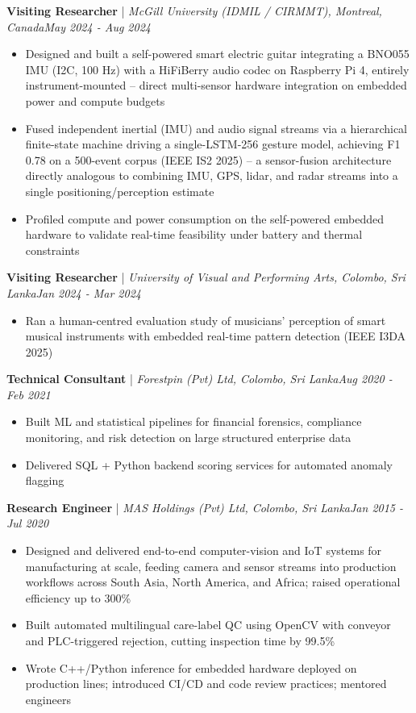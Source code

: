 \documentclass[11pt]{article}
\newenvironment{cvrole}[5]{%
  \par\noindent\textbf{\large #1} | \textit{\small #2, #3}\hfill \textit{\small #4 - #5}\par
  \begin{itemize}[leftmargin=2em, itemsep=-0.3em, topsep=-0.5em]%
}{%
  \end{itemize}\par\noindent\mbox{}\par\vspace{0.1em}%
}
\begin{document}
\begin{cvrole}{Visiting Researcher}{McGill University (IDMIL / CIRMMT)}{Montreal, Canada}{May 2024}{Aug 2024}
\item Designed and built a self-powered smart electric guitar integrating a BNO055 IMU (I2C, 100 Hz) with a HiFiBerry audio codec on Raspberry Pi 4, entirely instrument-mounted -- direct multi-sensor hardware integration on embedded power and compute budgets
\item Fused independent inertial (IMU) and audio signal streams via a hierarchical finite-state machine driving a single-LSTM-256 gesture model, achieving F1 0.78 on a 500-event corpus (IEEE IS2 2025) -- a sensor-fusion architecture directly analogous to combining IMU, GPS, lidar, and radar streams into a single positioning/perception estimate
\item Profiled compute and power consumption on the self-powered embedded hardware to validate real-time feasibility under battery and thermal constraints
\end{cvrole}

\begin{cvrole}{Visiting Researcher}{University of Visual and Performing Arts}{Colombo, Sri Lanka}{Jan 2024}{Mar 2024}
\item Ran a human-centred evaluation study of musicians' perception of smart musical instruments with embedded real-time pattern detection (IEEE I3DA 2025)
\end{cvrole}

\begin{cvrole}{Technical Consultant}{Forestpin (Pvt) Ltd}{Colombo, Sri Lanka}{Aug 2020}{Feb 2021}
\item Built ML and statistical pipelines for financial forensics, compliance monitoring, and risk detection on large structured enterprise data
\item Delivered SQL + Python backend scoring services for automated anomaly flagging
\end{cvrole}

\begin{cvrole}{Research Engineer}{MAS Holdings (Pvt) Ltd}{Colombo, Sri Lanka}{Jan 2015}{Jul 2020}
\item Designed and delivered end-to-end computer-vision and IoT systems for manufacturing at scale, feeding camera and sensor streams into production workflows across South Asia, North America, and Africa; raised operational efficiency up to 300\%
\item Built automated multilingual care-label QC using OpenCV with conveyor and PLC-triggered rejection, cutting inspection time by 99.5\%
\item Wrote C++/Python inference for embedded hardware deployed on production lines; introduced CI/CD and code review practices; mentored engineers
\end{cvrole}
\end{document}
